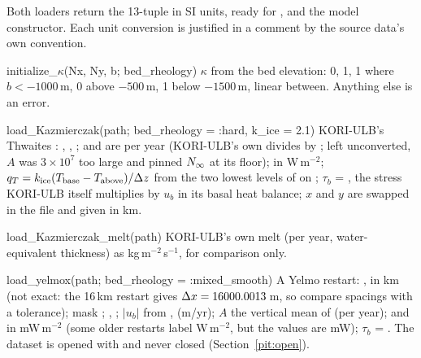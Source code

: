 Both loaders return the 13-tuple  in SI units,
ready for ,  and the model constructor. Each unit conversion is
justified in a comment by the source data's own convention.
\begin{fnlist}
\item[initialize\_\ensuremath{\kappa}(Nx, Ny, b; bed\_rheology)] $\kappa$ from the bed elevation:  0,  1,  1 where
  $b < -1000$\,m,  0 above $-500$\,m, 1 below $-1500$\,m, linear between. Anything else is an error.
\item[load\_Kazmierczak(path; bed\_rheology = :hard, k\_ice = 2.1)] KORI-ULB's Thwaites : , , ;
   and  are per year (KORI-ULB's own  divides  by ; left unconverted,
  $A$ was $3\times10^7$ too large and pinned ${N_\infty}$ at its floor);  in W\,m$^{-2}$; $q_T = k_{\rm ice}(T_{\rm base} - T_{\rm above})/\Delta z$
  from the two lowest levels of  on ; $\tau_b$ = , the stress KORI-ULB itself multiplies by $u_b$ in
  its basal heat balance; $x$ and $y$ are swapped in the file and given in km.
\item[load\_Kazmierczak\_melt(path)] KORI-ULB's own melt  (per year, water-equivalent thickness) as kg\,m$^{-2}$\,s$^{-1}$, for
  comparison only.
\item[load\_yelmox(path; bed\_rheology = :mixed\_smooth)] A Yelmo restart: ,  in km (not exact: the 16\,km restart gives $\Delta x = 16000.0013$\,m, so compare spacings with a
  tolerance); mask ;
  , ; $|u_b|$ from ,  (m/yr); $A$ the vertical mean of  (per year);  and
   in mW\,m$^{-2}$ (some older restarts label  W\,m$^{-2}$, but the values are mW); $\tau_b$ = .
  The dataset is opened with  and never closed (Section~\ref{pit:open}).
\end{fnlist}

